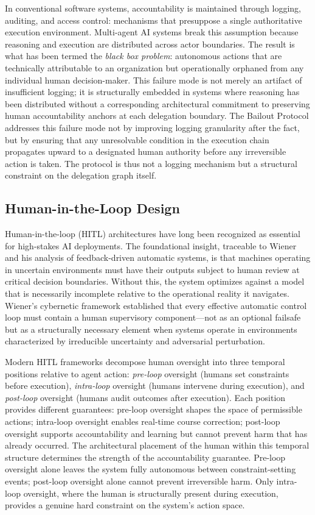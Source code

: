 \documentclass[12pt]{article}
\begin{document}
In conventional software systems, accountability is maintained through logging, auditing, and access control: mechanisms that presuppose a single authoritative execution environment. Multi-agent AI systems break this assumption because reasoning and execution are distributed across actor boundaries. The result is what has been termed the \textit{black box problem}: autonomous actions that are technically attributable to an organization but operationally orphaned from any individual human decision-maker. This failure mode is not merely an artifact of insufficient logging; it is structurally embedded in systems where reasoning has been distributed without a corresponding architectural commitment to preserving human accountability anchors at each delegation boundary. The Bailout Protocol addresses this failure mode not by improving logging granularity after the fact, but by ensuring that any unresolvable condition in the execution chain propagates upward to a designated human authority before any irreversible action is taken. The protocol is thus not a logging mechanism but a structural constraint on the delegation graph itself.

\subsection{Human-in-the-Loop Design}

Human-in-the-loop (HITL) architectures have long been recognized as essential for high-stakes AI deployments. The foundational insight, traceable to Wiener \cite{wiener1948} and his analysis of feedback-driven automatic systems, is that machines operating in uncertain environments must have their outputs subject to human review at critical decision boundaries. Without this, the system optimizes against a model that is necessarily incomplete relative to the operational reality it navigates. Wiener's cybernetic framework established that every effective automatic control loop must contain a human supervisory component—not as an optional failsafe but as a structurally necessary element when systems operate in environments characterized by irreducible uncertainty and adversarial perturbation.

Modern HITL frameworks \cite{bansal2019} decompose human oversight into three temporal positions relative to agent action: \textit{pre-loop} oversight (humans set constraints before execution), \textit{intra-loop} oversight (humans intervene during execution), and \textit{post-loop} oversight (humans audit outcomes after execution). Each position provides different guarantees: pre-loop oversight shapes the space of permissible actions; intra-loop oversight enables real-time course correction; post-loop oversight supports accountability and learning but cannot prevent harm that has already occurred. The architectural placement of the human within this temporal structure determines the strength of the accountability guarantee. Pre-loop oversight alone leaves the system fully autonomous between constraint-setting events; post-loop oversight alone cannot prevent irreversible harm. Only intra-loop oversight, where the human is structurally present during execution, provides a genuine hard constraint on the system's action space.
\end{document}
